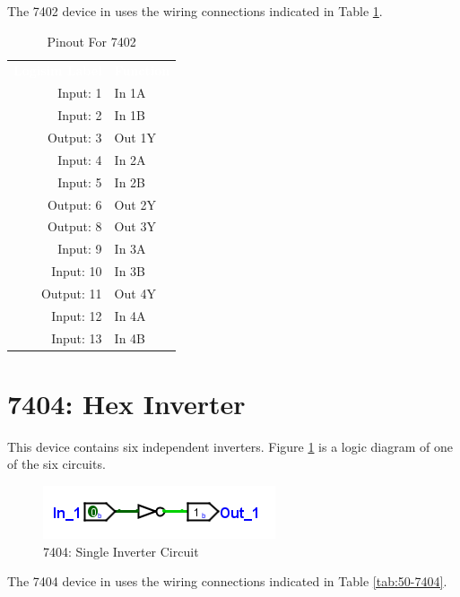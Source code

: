 The 7402 device in \LE uses the wiring connections indicated in Table \ref{tab:50-7402}.

\begin{table}[H]
	\sffamily
	\newcommand{\head}[1]{\textcolor{white}{\textbf{#1}}}		
	\begin{center}
		\begin{tabular}{rl} 
			\rowcolor{black!75}
			\head{Logisim Label} & \head{Function} \\
			Input: 1   & In 1A  \\
			Input: 2   & In 1B  \\
			Output: 3  & Out 1Y \\
			Input: 4   & In 2A  \\
			Input: 5   & In 2B  \\
			Output: 6  & Out 2Y \\
			Output: 8  & Out 3Y \\
			Input: 9   & In 3A  \\
			Input: 10  & In 3B  \\
			Output: 11 & Out 4Y \\
			Input: 12  & In 4A  \\
			Input: 13  & In 4B  \\
		\end{tabular}
	\end{center}
	\caption{Pinout For 7402}
	\label{tab:50-7402}
\end{table}

\section{7404: Hex Inverter}

This device contains six independent inverters. Figure \ref{fig:50-7404} is a logic diagram of one of the six circuits.

\begin{figure}[H]
	\centering
	\includegraphics{gfx/50-7404}
	\caption{7404: Single Inverter Circuit}
	\label{fig:50-7404}
\end{figure}

The 7404 device in \LE uses the wiring connections indicated in Table \ref{tab:50-7404}.

